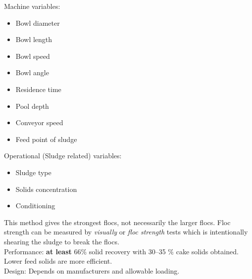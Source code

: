\documentclass{article}
\numberwithin{equation}{section}
\begin{document}
\begin{enumerate}
\begin{enumerate}
        Machine variables:
        \begin{itemize}
            \item Bowl diameter
            \item Bowl length
            \item Bowl speed
            \item Bowl angle
            \item Residence time
            \item Pool depth
            \item Conveyor speed
            \item Feed point of sludge
        \end{itemize}
        Operational (Sludge related) variables:
        \begin{itemize}
            \item Sludge type
            \item Solids concentration
            \item Conditioning
        \end{itemize}
        This method gives the strongest flocs, not necessarily the larger flocs. Floc strength can be measured by \emph{visually} or \emph{floc strength} tests which is intentionally shearing the sludge to break the flocs.\\
        Performance: \textbf{at least} 66\% solid recovery with 30--35 \% cake solids obtained. Lower feed solids are more efficient.\\
        Design: Depends on manufacturers and allowable loading.
    \end{enumerate}
\end{enumerate}
\end{document}
